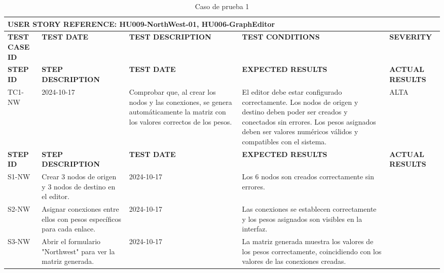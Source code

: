 \small %
\renewcommand{\arraystretch}{1.0} %
\setlength{\tabcolsep}{4pt} %

\begin{longtable}{|p{2cm}|p{3cm}|p{3cm}|p{3cm}|p{3cm}|}
  \caption{Caso de prueba 1} \label{tab:casos_prueba1} \\
  \hline
  \multicolumn{5}{|l|}{\textbf{USER STORY REFERENCE: HU009-NorthWest-01, HU006-GraphEditor}} \\ \hline
  \textbf{TEST CASE ID} & \textbf{TEST DATE} & \textbf{TEST DESCRIPTION} & \textbf{TEST CONDITIONS} & \textbf{SEVERITY} \\ \hline
  \endfirsthead
  \hline
  \textbf{STEP ID} & \textbf{STEP DESCRIPTION} & \textbf{TEST DATE} & \textbf{EXPECTED RESULTS} & \textbf{ACTUAL RESULTS} \\ \hline
  \endhead
  TC1-NW & 2024-10-17 & Comprobar que, al crear los nodos y las conexiones, se genera automáticamente la matriz con los valores correctos de los pesos. & El editor debe estar configurado correctamente. Los nodos de origen y destino deben poder ser creados y conectados sin errores. Los pesos asignados deben ser valores numéricos válidos y compatibles con el sistema. & ALTA \\ \hline
  \textbf{STEP ID} & \textbf{STEP DESCRIPTION} & \textbf{TEST DATE} & \textbf{EXPECTED RESULTS} & \textbf{ACTUAL RESULTS} \\ \hline
  S1-NW & Crear 3 nodos de origen y 3 nodos de destino en el editor. & 2024-10-17 & Los 6 nodos son creados correctamente sin errores. & \\ \hline
  S2-NW & Asignar conexiones entre ellos con pesos específicos para cada enlace. & 2024-10-17 & Las conexiones se establecen correctamente y los pesos asignados son visibles en la interfaz. & \\ \hline
  S3-NW & Abrir el formulario "Northwest" para ver la matriz generada. & 2024-10-17 & La matriz generada muestra los valores de los pesos correctamente, coincidiendo con los valores de las conexiones creadas. & \\ \hline
\end{longtable}


